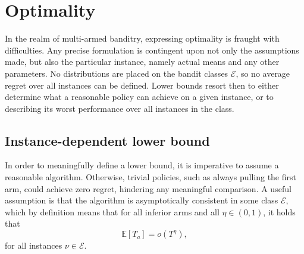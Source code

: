 \section{Optimality}
In the realm of multi-armed banditry, expressing optimality is fraught with difficulties.
Any precise formulation is contingent upon not only the assumptions made, but also the particular instance, namely actual means and any other parameters.
No distributions are placed on the bandit classes $\mathcal{E}$, so no average regret over all instances can be defined.
Lower bounds resort then to either determine what a reasonable policy can achieve on a given instance, or to describing its worst performance over all instances in the class.

\subsection{Instance-dependent lower bound}
In order to meaningfully define a lower bound, it is imperative to assume a reasonable algorithm.
Otherwise, trivial policies, such as always pulling the first arm, could achieve zero regret, hindering any meaningful comparison.
A useful assumption is that the algorithm is asymptotically consistent in some class $\mathcal{E}$, which by definition means that for all inferior arms and all $\eta \in (0, 1)$, it holds that
\begin{equation}
    \mathbb{E}[T_a] = o(T^{\eta}),
\end{equation}
for all instances $\nu \in \mathcal{E}$.

